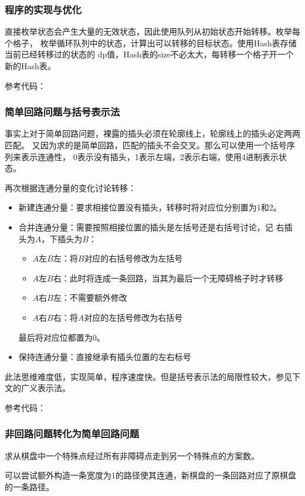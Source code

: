\subsubsection{程序的实现与优化}
直接枚举状态会产生大量的无效状态，因此使用队列从初始状态开始转移。枚举每个格子，
枚举循环队列中的状态，计算出可以转移的目标状态。使用Hash表存储当前已经转移过的状态的
dp值，Hash表的size不必太大，每转移一个格子开一个新的Hash表。

参考代码：

\subsubsection{简单回路问题与括号表示法}
事实上对于简单回路问题，裸露的插头必须在轮廓线上，轮廓线上的插头必定两两匹配。
又因为求的是简单回路，匹配的插头不会交叉。那么可以使用一个括号序列来表示连通性，
0表示没有插头，1表示左端，2表示右端，使用4进制表示状态。

再次根据连通分量的变化讨论转移：
\begin{itemize}
    \item 新建连通分量：要求相接位置没有插头，转移时将对应位分别置为1和2。
    \item 合并连通分量：需要按照相接位置的插头是左括号还是右括号讨论，记
    右插头为$A$，下插头为$B$：
    \begin{itemize}
        \item $A$左$B$左：将$B$对应的右括号修改为左括号
        \item $A$左$B$右：此时将连成一条回路，当其为最后一个无障碍格子时才转移
        \item $A$右$B$左：不需要额外修改
        \item $A$右$B$右：将$A$对应的左括号修改为右括号
    \end{itemize}
    最后将对应位都置为0。
    \item 保持连通分量：直接继承有插头位置的左右标号
\end{itemize}

此法思维难度低，实现简单，程序速度快。但是括号表示法的局限性较大，参见下文的广义表示法。

参考代码：

\subsubsection{非回路问题转化为简单回路问题}
求从棋盘中一个特殊点经过所有非障碍点走到另一个特殊点的方案数。

可以尝试额外构造一条宽度为1的路径使其连通，新棋盘的一条回路对应了原棋盘的一条路径。
